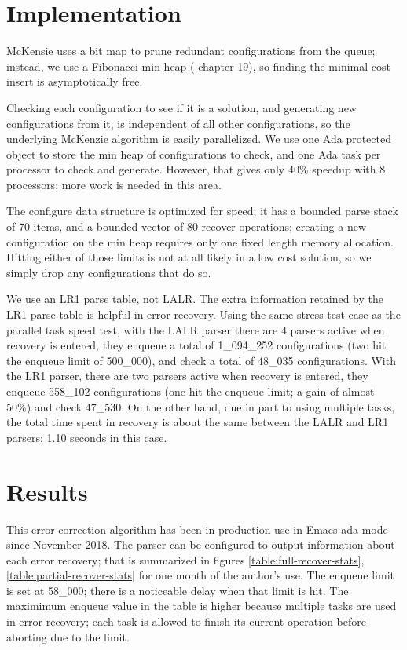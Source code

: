 \documentclass{article}
\begin{document}
\section{Implementation}
McKensie uses a bit map to prune redundant configurations from the
queue; instead, we use a Fibonacci min heap (\cite{algorithms 2009}
chapter 19), so finding the minimal cost insert is asymptotically
free.

Checking each configuration to see if it is a solution, and generating
new configurations from it, is independent of all other
configurations, so the underlying McKenzie algorithm is easily
parallelized. We use one Ada protected object to store the min heap of
configurations to check, and one Ada task per processor to check and
generate. However, that gives only 40\% speedup with 8 processors;
more work is needed in this area.

The configure data structure is optimized for speed; it has a bounded
parse stack of 70 items, and a bounded vector of 80 recover
operations; creating a new configuration on the min heap requires only
one fixed length memory allocation. Hitting either of those limits is
not at all likely in a low cost solution, so we simply drop any
configurations that do so.

We use an LR1 parse table, not LALR. The extra information retained by
the LR1 parse table is helpful in error recovery. Using the same
stress-test case as the parallel task speed test, with the LALR parser
there are 4 parsers active when recovery is entered, they enqueue a
total of 1\_094\_252 configurations (two hit the enqueue limit of
500\_000), and check a total of 48\_035 configurations. With the LR1
parser, there are two parsers active when recovery is entered, they
enqueue 558\_102 configurations (one hit the enqueue limit; a gain of
almost 50\%) and check 47\_530. On the other hand, due in part to
using multiple tasks, the total time spent in recovery is about the
same between the LALR and LR1 parsers; 1.10 seconds in this case.

\section{Results}
This error correction algorithm has been in production use in Emacs
ada-mode since November 2018. The parser can be configured to output
information about each error recovery; that is summarized in figures
\ref{table:full-recover-stats}, \ref{table:partial-recover-stats} for
one month of the author's use. The enqueue limit is set at 58\_000;
there is a noticeable delay when that limit is hit. The maximimum
enqueue value in the table is higher because multiple tasks are used
in error recovery; each task is allowed to finish its current
operation before aborting due to the limit.
\end{document}
